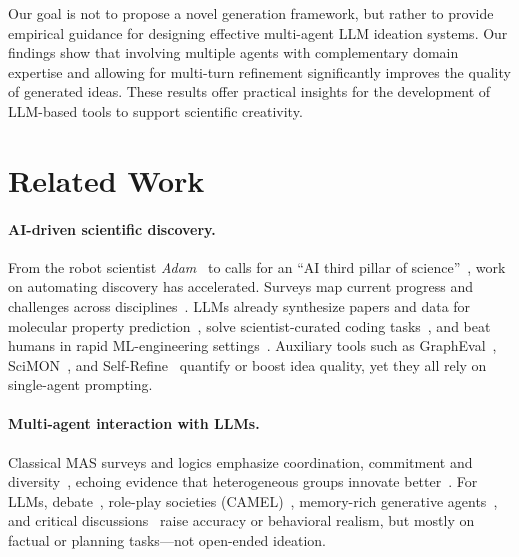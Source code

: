\documentclass[11pt]{article}
\begin{document}
Our goal is not to propose a novel generation framework, but rather to provide empirical guidance for designing effective multi-agent LLM ideation systems. Our findings show that involving multiple agents with complementary domain expertise and allowing for multi-turn refinement significantly improves the quality of generated ideas. These results offer practical insights for the development of LLM-based tools to support scientific creativity.

\section{Related Work}

\paragraph{AI-driven scientific discovery.}
From the robot scientist \emph{Adam}~\cite{king2009automation} to calls for an ``AI third pillar of science''~\cite{gil2014amplify,xu2021powerful,kitano2021nobelturing}, work on automating discovery has accelerated.
Surveys map current progress and challenges across disciplines~\cite{wang2023scientific,eger2025transforming}.
LLMs already synthesize papers and data for molecular property prediction~\cite{zheng2023large}, solve scientist-curated coding tasks~\cite{tian2024scicode}, and beat humans in rapid ML-engineering settings~\cite{wijk2024rebench}.
Auxiliary tools such as GraphEval~\cite{feng2025grapheval}, SciMON~\cite{wang2024scimon}, and Self-Refine~\cite{madaan2023selfrefine} quantify or boost idea quality, yet they all rely on single-agent prompting.

\paragraph{Multi-agent interaction with LLMs.}
Classical MAS surveys and logics emphasize coordination, commitment and diversity~\cite{dorri2018survey,duninkeplicz2011teamwork}, echoing evidence that heterogeneous groups innovate better~\cite{page2008diversity,paulus2019creativity}.
For LLMs, debate~\cite{du2023llmdebate}, role-play societies (CAMEL)~\cite{li2023camel}, memory-rich generative agents~\cite{park2023generative}, and critical discussions~\cite{wang2024rethinking} raise accuracy or behavioral realism, but mostly on factual or planning tasks—not open-ended ideation.
\end{document}

